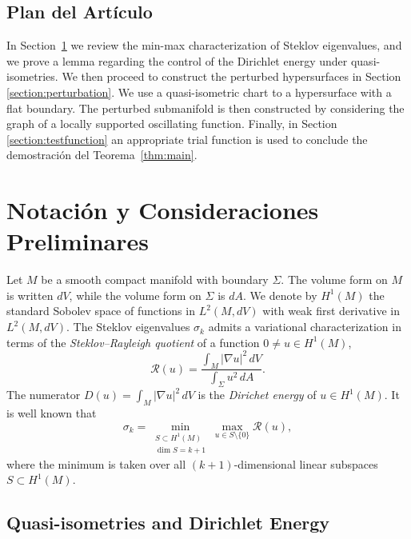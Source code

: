 \documentclass{GEM-JNL-FMP}
\theoremstyle{definition}
\numberwithin{equation}{section}
\begin{document}
\subsection*{Plan del Artículo}
In Section~\ref{section:prelim} we review the min-max characterization of Steklov eigenvalues, and we prove a lemma regarding the control of the Dirichlet energy under quasi-isometries. We then proceed to construct the perturbed hypersurfaces in Section \ref{section:perturbation}. We use a quasi-isometric chart to a hypersurface with a flat boundary. The perturbed submanifold is then constructed by considering the graph
of a locally supported oscillating function. Finally, in Section \ref{section:testfunction} an appropriate trial function is used to conclude the demostración del Teorema~\ref{thm:main}.


\section{Notación y Consideraciones Preliminares}\label{section:prelim}

Let $M$ be a smooth compact manifold with boundary $\Sigma$. The volume form on $M$ is written $dV$, while
the volume form on $\Sigma$ is $dA$. We denote by $H^1(M)$ the standard Sobolev space of functions in $ L^2(M,dV)$ with weak first derivative in $L^2(M,dV)$.
The Steklov eigenvalues $\sigma_k$ admits a variational characterization in terms of the \emph{Steklov--Rayleigh quotient} of a function $0\neq u \in H^1(M)$,
\begin{equation*}\label{StekRayleighQuotient}
    \mathcal{R}(u) = \frac{\int_{M} |\nabla u|^2\,dV}{\int_{\Sigma} u^2\,dA}.
\end{equation*}
The numerator $D(u)=\int_{M} |\nabla u|^2\,dV$ is the \emph{Dirichet energy} of $u\in H^1(M)$.
It is well known that
\begin{equation}\label{eq:minmaxsigmak}
    \sigma_k = \min_{\substack{S \subset H^1(M) \\ \dim S = k+1}}
    \max_{u \in S \setminus \{0\}} \mathcal{R}(u),
\end{equation}
where the minimum is taken over all $(k+1)$-dimensional linear subspaces $S\subset H^1(M)$.

\subsection{Quasi-isometries and Dirichlet Energy}
\end{document}
